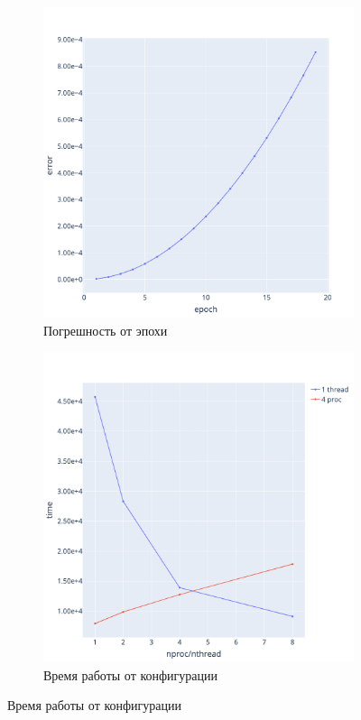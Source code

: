 \documentclass[a4paper,hidelinks,12pt]{article}
\begin{document}
\begin{figure}[H]
\begin{subfigure}{.5\textwidth}
  \centering
  \includegraphics[width=\linewidth]{pictures/Lpi_256_errs.png}
  \caption{Погрешность от эпохи}
\end{subfigure}%
\begin{subfigure}{.5\textwidth}
  \centering
  \includegraphics[width=\linewidth]{pictures/Lpi_256_perf.png}
  \caption{Время работы от конфигурации}
\end{subfigure}%
\end{figure}
\end{document}
